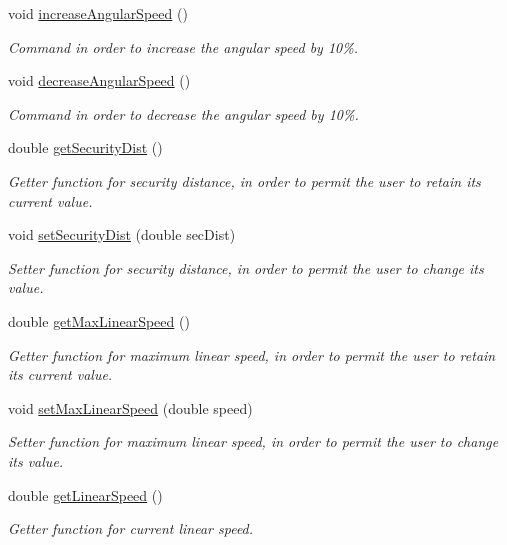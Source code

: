 \begin{DoxyCompactItemize}
void \hyperlink{class_nymeria_ad96f2f3ef25a0d466e2866ee020d0d57}{increase\+Angular\+Speed} ()
\begin{DoxyCompactList}\small\item\em Command in order to increase the angular speed by 10\%. \end{DoxyCompactList}\item 
void \hyperlink{class_nymeria_a354a426d9626623eb60f59bea93cf888}{decrease\+Angular\+Speed} ()
\begin{DoxyCompactList}\small\item\em Command in order to decrease the angular speed by 10\%. \end{DoxyCompactList}\item 
double \hyperlink{class_nymeria_a39846f73d57a98ab24a80a80be38ddef}{get\+Security\+Dist} ()
\begin{DoxyCompactList}\small\item\em Getter function for security distance, in order to permit the user to retain its current value. \end{DoxyCompactList}\item 
void \hyperlink{class_nymeria_af145b44f01dc82ba70f3b09bc459364d}{set\+Security\+Dist} (double sec\+Dist)
\begin{DoxyCompactList}\small\item\em Setter function for security distance, in order to permit the user to change its value. \end{DoxyCompactList}\item 
double \hyperlink{class_nymeria_adce898b1df4cdfe04a3dd6fca7745f36}{get\+Max\+Linear\+Speed} ()
\begin{DoxyCompactList}\small\item\em Getter function for maximum linear speed, in order to permit the user to retain its current value. \end{DoxyCompactList}\item 
void \hyperlink{class_nymeria_a97fb26da752c0ac03b4f0874f9513e01}{set\+Max\+Linear\+Speed} (double speed)
\begin{DoxyCompactList}\small\item\em Setter function for maximum linear speed, in order to permit the user to change its value. \end{DoxyCompactList}\item 
double \hyperlink{class_nymeria_a791c7e89a7044302557f7f1dbd6f6f84}{get\+Linear\+Speed} ()
\begin{DoxyCompactList}\small\item\em Getter function for current linear speed. \end{DoxyCompactList}\item 

\end{DoxyCompactItemize}
